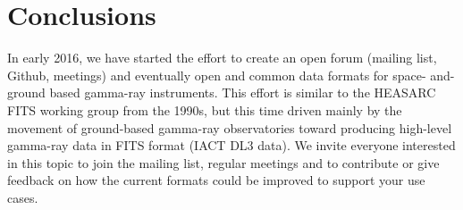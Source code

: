 \section{Conclusions}

In early 2016, we have started the \gadf effort to create an open forum (mailing list, Github, meetings) and eventually open and common data formats for space- and- ground based gamma-ray instruments. This effort is similar to the HEASARC FITS working group from the 1990s, but this time driven mainly by the movement of ground-based gamma-ray observatories toward producing high-level gamma-ray data in FITS format (IACT DL3 data). %
We invite everyone interested in this topic to join the mailing list, regular meetings and to contribute or give feedback on how the current formats could be improved to support your use cases.

